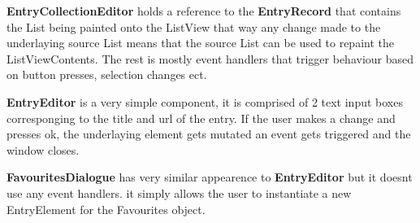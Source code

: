 \documentclass[../Main.tex]{subfiles}
\begin{document}
\textbf{EntryCollectionEditor} holds a reference to the \textbf{EntryRecord} that contains the List being painted onto the ListView that way any change made to the underlaying source List means that the source List can be used to repaint the ListViewContents. The rest is mostly event handlers that trigger behaviour based on button presses, selection changes ect.

\textbf{EntryEditor} is a very simple component, it is comprised of 2 text input boxes corresponging to the title and url of the entry. If the user makes a change and presses ok, the underlaying element gets mutated an event gets triggered and the window closes.

\textbf{FavouritesDialogue} has very similar appearence to \textbf{EntryEditor} but it doesnt use any event handlers. it simply allows the user to instantiate a new EntryElement for the Favourites object.
\end{document}
